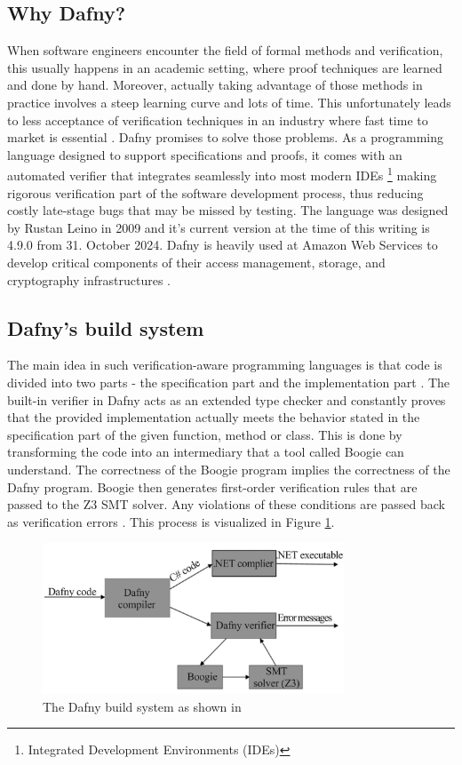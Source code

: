 \documentclass[a4paper]{article}
\begin{document}
\subsection{Why Dafny?}
When software engineers encounter the field of formal methods and verification, this usually happens
in an academic setting, where proof techniques are learned and done by hand. Moreover, actually taking advantage
of those methods in practice involves a steep learning curve and lots of time. This unfortunately leads to less
acceptance of verification techniques in
an industry where fast time to market is essential \cite{reid2020makingformalmethodsnormal}. Dafny promises to solve those problems. As a programming
language designed to support specifications and proofs, it comes with an automated verifier that integrates
seamlessly into most modern IDEs \footnote{Integrated Development Environments (IDEs)} making rigorous verification part of the software development process,
thus reducing costly late-stage bugs that may be missed by testing. The language was designed by Rustan Leino in
2009 and it's current version at the time of this writing is 4.9.0 from 31. October 2024. Dafny is heavily
used at Amazon Web Services to develop critical components of their access management, storage, and cryptography infrastructures \cite{Chakarov2022}.

\subsection{Dafny's build system}
The main idea in such verification-aware programming languages is that code is divided into two parts - the
specification part and the implementation part \cite{leino2023program}. The built-in verifier in Dafny acts as an
extended type checker and constantly proves that the provided implementation actually meets the behavior stated in
the specification part of the given function, method or class. This is done by transforming the code into an intermediary
that a tool called Boogie can understand. The correctness of the Boogie program implies the correctness of the
Dafny program. Boogie then generates first-order verification rules that are passed to the
Z3 SMT solver. Any violations of these conditions are passed back as verification errors \cite{Herbert2012}. This
process is visualized in Figure \ref{fig:build-system}.
\begin{figure}[h]
	\centering
	\includegraphics[width=0.80\textwidth]{images/dafny-infra.jpg}
	\caption{The Dafny build system as shown in \cite{Herbert2012}}
	\label{fig:build-system}
\end{figure}
\end{document}
